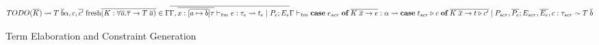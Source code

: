 \begin{figure}[h]
$${    \\
    TODO(\overline{K}) \rightsquigarrow T \; \overline{b}
    \\
    \alpha, c, \overline{c'} \; \text{fresh}
    \\
    \overline{(K : \forall \overline{a}. \overline{\tau} \rightarrow T \; \overline{a})}
    \in \Gamma
    \\
    \overline{\Gamma, \overline{x : [\overline{a \mapsto b}]\tau} \vdash_{tm} e
    : \tau_e \rightsquigarrow t_e \mid P_e; E_e}
}
{
    \Gamma \vdash_{tm} \textbf{case} \; e_{scr} \; \textbf{of} \; \overline{K \;
    \overline{x} \rightarrow e} : \alpha \\\rightsquigarrow \textbf{case} \;
    t_{scr} \triangleright c \; \textbf{of} \; \overline{K \; \overline{x} \rightarrow t
    \triangleright c'} \mid P_{scr}, \overline{P_e}; E_{scr}, \overline{E_e}, c :
    \tau_{scr} \sim T \; \overline{b}
}
$$
\caption{Term Elaboration and Constraint Generation}
\end{figure}

